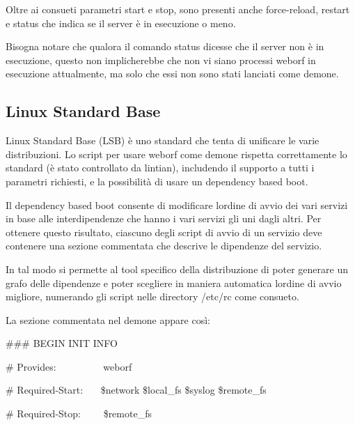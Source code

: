 \documentclass[a4paper,11pt]{article}
\begin{document}
\bigskip

{\sffamily
Oltre ai consueti parametri {\textquotedbl}start{\textquotedbl} e
{\textquotedbl}stop{\textquotedbl}, sono presenti anche
{\textquotedbl}force-reload{\textquotedbl},
{\textquotedbl}restart{\textquotedbl} e
{\textquotedbl}status{\textquotedbl} che indica se il server \`e in
esecuzione o meno.}

{\sffamily
Bisogna notare che qualora il comando status dicesse che il server non
\`e in esecuzione, questo non implicherebbe che non vi siano processi
weborf in esecuzione attualmente, ma solo che essi non sono stati
lanciati come demone.}


\bigskip

\subsection{Linux Standard Base}
{\sffamily
Linux Standard Base (LSB) \`e uno standard che tenta di unificare le
varie distribuzioni. Lo script per usare weborf come demone rispetta
correttamente lo standard (\`e stato controllato da lintian),
includendo il supporto a tutti i parametri richiesti, e la
possibilit\`a di usare un dependency based boot.}


\bigskip

{\sffamily
Il dependency based boot consente di modificare
l{\textquotesingle}ordine di avvio dei vari servizi in base alle
interdipendenze che hanno i vari servizi gli uni dagli altri. Per
ottenere questo risultato, ciascuno degli script di avvio di un
servizio deve contenere una sezione commentata che descrive le
dipendenze del servizio.}

{\sffamily
In tal modo si permette al tool specifico della distribuzione di poter
generare un grafo delle dipendenze e poter scegliere in maniera
automatica l{\textquotesingle}ordine di avvio migliore, numerando gli
script nelle directory /etc/rc come consueto\cite{LSB01}.}


\bigskip

{\sffamily
La sezione commentata nel demone appare cos\`i:}


\bigskip

{\ttfamily
\#\#\# BEGIN INIT INFO}

{\ttfamily
\# Provides: \ \ \ \ \ \ \ \ \ weborf}

{\ttfamily
\# Required-Start: \ \ \ \$network \$local\_fs \$syslog \$remote\_fs}

{\ttfamily
\# Required-Stop: \ \ \ \ \$remote\_fs}
\end{document}
